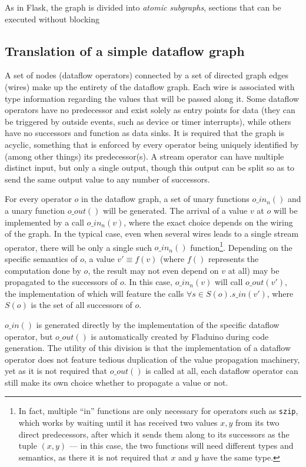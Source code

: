 \documentclass[a4paper, oneside, final]{memoir}
\begin{document}
As in Flask, the graph is divided into \textit{atomic subgraphs},
sections that can be executed without blocking

\subsection{Translation of a simple dataflow graph}

A set of nodes (dataflow operators) connected by a set of directed
graph edges (wires) make up the entirety of the dataflow graph. Each
wire is associated with type information regarding the values that
will be passed along it.  Some dataflow operators have no predecessor
and exist solely as entry points for data (they can be triggered by
outside events, such as device or timer interrupts), while others have
no successors and function as data sinks.  It is required that the
graph is acyclic, something that is enforced by every operator being
uniquely identified by (among other things) its predecessor(s).  A
stream operator can have multiple distinct input, but only a single
output, though this output can be split so as to send the same output
value to any number of successors.

For every operator $o$ in the dataflow graph, a set of unary
functions $o\_in_n()$ and a unary function $o\_out()$ will be
generated.  The arrival of a value $v$ at $o$ will be implemented by a
call $o\_in_n(v)$, where the exact choice depends on the wiring of the
graph.  In the typical case, even when several wires leads to a single
stream operator, there will be only a single such $o\_in_n()$
function\footnote{In fact, multiple ``in'' functions are only
  necessary for operators such as \texttt{szip}, which works by
  waiting until it has received two values $x, y$ from its two direct
  predecessors, after which it sends them along to its successors as
  the tuple $(x,y)$ --- in this case, the two functions will need
  different types and semantics, as there it is not required that $x$
  and $y$ have the same type.}.  Depending on the specific semantics
of $o$, a value $v'\equiv f(v)$ (where $f()$ represents the
computation done by $o$, the result may not even depend on $v$ at all)
may be propagated to the successors of $o$.  In this case,
$o\_in_n(v)$ will call $o\_out(v')$, the implementation of which will
feature the calls $\forall s \in S(o). s\_in(v')$, where $S(o)$ is the
set of all successors of $o$.

$o\_in()$ is generated directly by the implementation of the specific
dataflow operator, but $o\_out()$ is automatically created by Fladuino
during code generation.  The utility of this division is that the
implementation of a dataflow operator does not feature tedious
duplication of the value propagation machinery, yet as it is not
required that $o\_out()$ is called at all, each dataflow operator can
still make its own choice whether to propagate a value or not.
\end{document}
